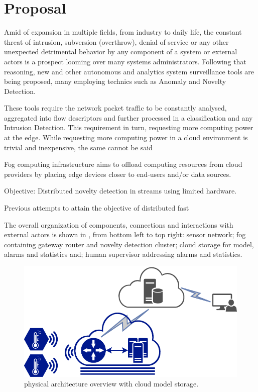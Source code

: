 \section{Proposal}\label{sec:prop}

Amid of \iot expansion in multiple fields, from industry to daily life,
the constant threat of intrusion, subversion (overthrow), denial of service
or any other unexpected detrimental behavior by any component of a system or
external actors is a prospect looming over many systems administrators.
Following that reasoning, new \nids and other autonomous and analytics system
surveillance tools are being proposed, many employing technics such as Anomaly
and Novelty Detection.

These tools require the network packet traffic to be constantly analysed,
aggregated into flow descriptors and further processed in a classification
and any Intrusion Detection.
This requirement in turn, requesting more computing power at the edge.
While requesting more computing power in a cloud environment is trivial and
inexpensive, the same cannot be said 

\begin{highlight}
Fog computing infrastructure aims to offload
computing resources from cloud providers by placing edge
devices closer to end-users and/or data sources.

Objective: Distributed novelty detection in streams using limited hardware.

Previous attempts to attain the objective of distributed fast
\end{highlight}

The overall organization of components, connections and interactions with external
actors is shown in ,
from bottom left to top right: sensor network; fog containing gateway router
and novelty detection cluster; cloud storage for model, alarms and statistics
and; human supervisor addressing alarms and statistics.

\begin{figure}[hbt]
  \centering
  \includegraphics[width=0.9\linewidth,page=1]{figures/mfog-arch-fisica.svg.pdf}
  \caption{\mfog physical architecture overview with cloud model storage.}
  \label{fig:mfog-phy-arch-cloud}
\end{figure}